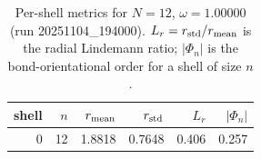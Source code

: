\begin{table}[t]
\centering
\small
\setlength{\tabcolsep}{4pt}
\renewcommand{\arraystretch}{1.15}
\begin{tabular}{r r r r r r}
\toprule
shell & $n$ & $r_{\rm mean}$ & $r_{\rm std}$ & $L_r$ & $|\Phi_n|$ \\
\midrule
0 & 12 & 1.8818 & 0.7648 & 0.406 & 0.257 \\
\bottomrule
\end{tabular}
\caption{Per-shell metrics for $N=12$, $\omega=1.00000$ (run 20251104_194000). $L_r=r_{\rm std}/r_{\rm mean}$ is the radial Lindemann ratio; $|\Phi_n|$ is the bond-orientational order for a shell of size $n$.}
\end{table}